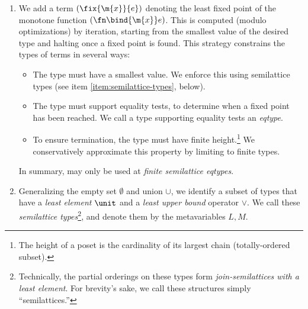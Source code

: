 \begin{enumerate}
\item We add a term $(\fix{\m{x}}{e})$ denoting the least fixed point of the
  monotone function $(\fn\bind{\m{x}} e)$. 
  This is computed (modulo optimizations) by iteration, starting from the
  smallest value of the desired type and halting once a fixed point is found.
  This strategy constrains the types of  terms in several ways:
  \begin{itemize}
  \item The type must have a smallest value. We enforce this using semilattice
    types (see item \ref{item:semilattice-types}, below).

  \item The type must support equality tests, to determine when a fixed point
    has been reached. We call a type supporting equality tests an \emph{eqtype}.

  \item To ensure termination, the type must have finite height.\footnote{The
    height of a poset is the cardinality of its largest chain (totally-ordered
    subset).} We conservatively approximate this property by limiting 
    to finite types.
  \end{itemize}

  In summary,  may only be used at \emph{finite semilattice eqtypes}.




\item\label{item:semilattice-types} Generalizing the empty set $\emptyset$ and
  union $\cup$, we identify a subset of types that have a \emph{least element}
  $\unit$ and a \emph{least upper bound} operator $\vee$. We call these
  \emph{semilattice types}\footnote{Technically, the partial orderings on these
    types form \emph{join-semilattices with a least element}. For brevity's
    sake, we call these structures simply ``semilattices.''}, and denote them by
  the metavariables $L,M$.


\end{enumerate}
